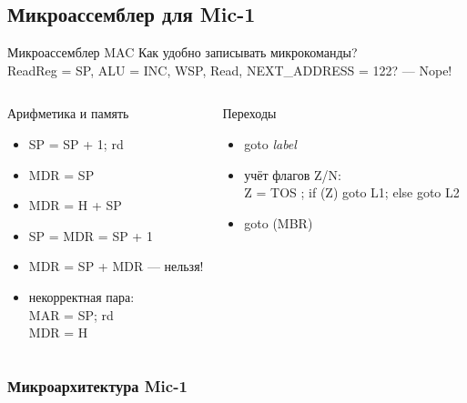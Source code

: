\subsection{Микроассемблер для Mic-1}

\begin{frame}{Микроассемблер MAC}
    \alert{Как удобно записывать микрокоманды?}\\
    {\small ReadReg = SP, ALU = INC, WSP, Read, NEXT\_ADDRESS = 122? \pause — Nope!}
    \pause

\begin{columns}
        \column{5cm}
    \begin{block}{Арифметика и память}
    \begin{itemize}
        \item \pause SP = SP + 1; rd
        \item \pause MDR = SP
        \item \pause MDR = H + SP
        \item \pause SP = MDR = SP + 1
        \item \pause MDR = SP + MDR \pause — нельзя!
        \item \pause некорректная пара:\\
            MAR = SP; rd \\
            MDR = H
    \end{itemize}
    \end{block}

        \column{6.5cm}
    \pause \begin{block}{Переходы}
    \begin{itemize}
        \item \pause goto \textit{label}
        \item \pause учёт флагов Z/N:\\
            {\small Z = TOS ; if (Z) goto L1; else goto L2}
        \item \pause goto (MBR)
    \end{itemize}
    \end{block}

\end{columns}
\end{frame}

\begin{frame}[plain]
\frametitle{Микроархитектура Mic-1}
\vspace{-.3cm}
\end{frame}

